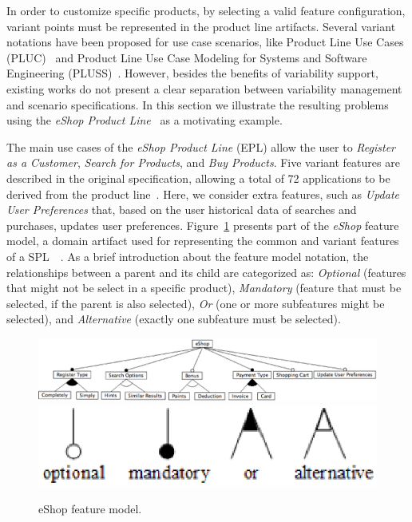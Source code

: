 \documentclass{acm_proc_article-sp}
\begin{document}
In order to customize specific products, by selecting a valid feature configuration, variant points must be represented in the 
product line artifacts. Several variant notations have been proposed for use case scenarios, like  Product Line Use Cases (PLUC)~\cite{bertolino-esec-2003} and Product Line Use Case Modeling for Systems and
Software Engineering (PLUSS)~\cite{eriksson-splc-2005}. However, besides
the benefits of variability support, existing works do not present a clear separation between variability 
management and scenario specifications. In this section we illustrate the resulting problems 
using the \emph{eShop Product Line}~\cite{eshop-url} as a motivating example. 

The main use cases of the \emph{eShop Product Line} (EPL) 
allow the user to \emph{Register as a Customer}, \emph{Search for Products}, 
and \emph{Buy Products}.  Five variant features are described in the original specification,
allowing a total  of 72 applications to be derived from the product line~\cite{eshop-url}. Here, 
we consider extra features, such as \emph{Update User Preferences} that, based on the user historical data of searches 
and purchases, updates user preferences. Figure~\ref{fig:eshop-fm} presents part of the \emph{eShop} feature model, a 
domain artifact used for representing the common and variant features of a SPL~~\cite{gheyi-alloy-06,czarnecki-book,kang-foda-report}. 
As a brief introduction about the feature model notation, the relationships between a parent and its child are 
categorized as: \emph{Optional} (features that might not be select in a specific product), \emph{Mandatory} (feature that must be selected, if the parent is also 
selected), \emph{Or} (one or more subfeatures might be selected), and \emph{Alternative} (exactly one subfeature must be selected).     

 \begin{figure}[h]
 \begin{center}
  \includegraphics[scale=0.25]{img/eShop-fm3.eps}
   \includegraphics[scale=0.30]{img/fm-notation.eps}
  \caption{eShop feature model.}
  \label{fig:eshop-fm}
  \end{center}
\end{figure}
\end{document}

